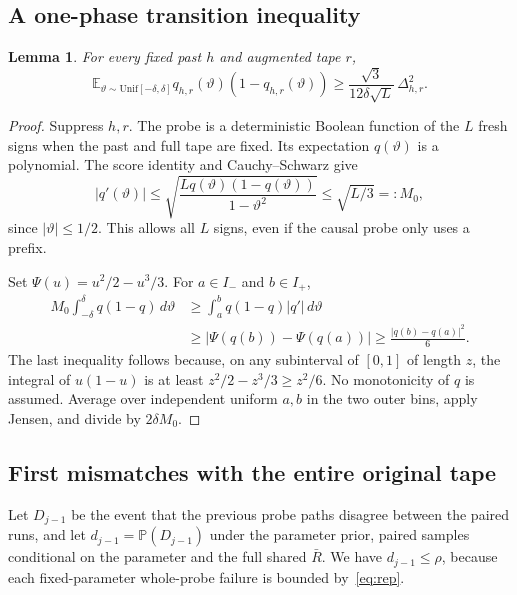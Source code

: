 \documentclass[11pt]{article}
\newtheorem{lemma}[theorem]{Lemma}
\newcommand{\E}{\mathbb E}
\newcommand{\Prob}{\mathbb P}
\newcommand{\1}{\mathbf 1}
\begin{document}
\subsection{A one-phase transition inequality}

\begin{lemma}\label{lem:transition}
For every fixed past $h$ and augmented tape $r$,
\begin{equation}\label{eq:coarea}
 \E_{\vartheta\sim\mathrm{Unif}[-\delta,\delta]}
  q_{h,r}(\vartheta)(1-q_{h,r}(\vartheta))
 \ge\frac{\sqrt3}{12\delta\sqrt L}\,\Delta_{h,r}^2.
\end{equation}
\end{lemma}

\begin{proof}
Suppress $h,r$. The probe is a deterministic Boolean function of
the $L$ fresh signs when the past and full tape are fixed.
Its expectation $q(\vartheta)$ is a polynomial. The score identity
and Cauchy--Schwarz give
\[
 |q'(\vartheta)|
 \le\sqrt{\frac{Lq(\vartheta)(1-q(\vartheta))}{1-\vartheta^2}}
 \le\sqrt{L/3}=:M_0 ,
\]
since $|\vartheta|\le1/2$. This allows all $L$ signs, even if
the causal probe only uses a prefix.

Set $\Psi(u)=u^2/2-u^3/3$. For $a\in I_-$ and $b\in I_+$,
\[
 \begin{split}
 M_0\int_{-\delta}^{\delta}q(1-q)\,d\vartheta
 &\ge\int_a^b q(1-q)|q'|\,d\vartheta\\
 &\ge|\Psi(q(b))-\Psi(q(a))|
 \ge\frac{|q(b)-q(a)|^2}{6}.
 \end{split}
\]
The last inequality follows because, on any subinterval of $[0,1]$
of length $z$, the integral of $u(1-u)$ is at least
$z^2/2-z^3/3\ge z^2/6$. No monotonicity of $q$ is assumed.
Average over independent uniform $a,b$ in the two outer bins,
apply Jensen, and divide by $2\delta M_0$.
\end{proof}

\subsection{First mismatches with the entire original tape}

Let $D_{j-1}$ be the event that the previous probe paths disagree
between the paired runs, and let $d_{j-1}=\Prob(D_{j-1})$ under
the parameter prior, paired samples conditional on the parameter
and the full shared $\bar R$. We have $d_{j-1}\le\rho$, because
each fixed-parameter whole-probe failure is bounded by~\eqref{eq:rep}.
\end{document}

